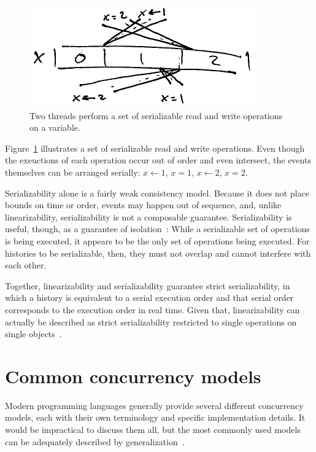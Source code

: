\documentclass{sig-alternate}
\begin{document}
\begin{figure}[h]
  \centering
  \includegraphics{serializability}
  \caption{Two threads perform a set of serializable read and write operations on a variable.}
\label{figure:serializability}
\end{figure}

Figure~\ref{figure:serializability} illustrates a set of serializable read and write operations. Even though the exeuctions of each operation occur out of order and even intersect, the events themselves can be arranged serially: $x \leftarrow 1$, $x = 1$, $x \leftarrow 2$, $x = 2$.

Serializability alone is a fairly weak consistency model. Because it does not place bounds on time or order, events may happen out of sequence, and, unlike linearizability, serializability is not a composable guarantee. Serializability is useful, though, as a guarantee of isolation~\cite{Haerder1983}: While a serializable set of operations is being executed, it appears to be the only set of operations being executed. For histories to be serializable, then, they must not overlap and cannot interfere with each other.

Together, linearizability and serializability guarantee strict serializability, in which a history is equivalent to a serial execution order and that serial order corresponds to the execution order in real time. Given that, linearizability can actually be described as strict serializability restricted to single operations on single objects~\cite{Herlihy1990}.

\section{Common concurrency models}

Modern programming languages generally provide several different concurrency models, each with their own terminology and specific implementation details. It would be impractical to discuss them all, but the most commonly used models can be adequately described by generalization~\cite{Swalens2014}.
\end{document}
